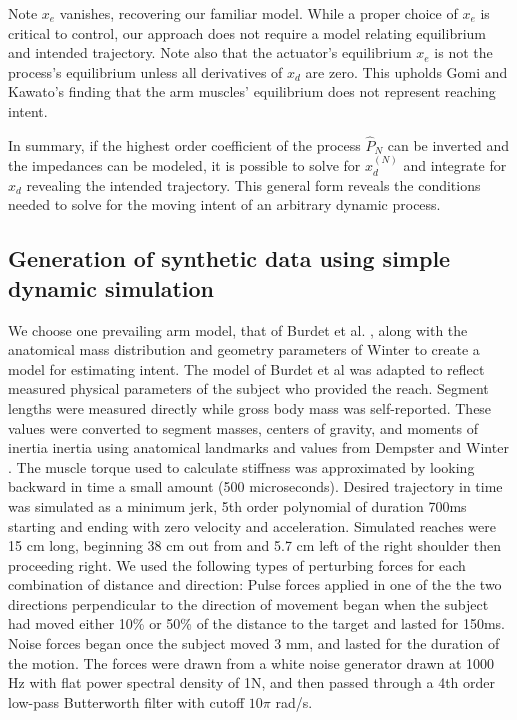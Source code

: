 \documentclass[10pt]{article}
\begin{document}
Note $x_e$ vanishes, recovering our familiar model. While a proper choice of $x_e$ is critical to control, our approach does not require a model relating equilibrium and intended trajectory. Note also that the actuator's equilibrium $x_e$ is not the process's equilibrium unless all derivatives of $x_d$ are zero. This upholds Gomi and Kawato's finding that the arm muscles' equilibrium does not represent reaching intent\cite{gomi1997human}.

In summary, if the highest order coefficient of the process $\hat{P}_N$ can be inverted and the impedances can be modeled, it is possible to solve for $x_d^{(N)}$ and integrate for $x_d$ revealing the intended trajectory. This general form reveals the conditions needed to solve for the moving intent of an arbitrary dynamic process. 

\subsection*{Generation of synthetic data using simple dynamic simulation}
We choose one prevailing arm model, that of Burdet et al. \cite{burdet2006stability}, along with the anatomical mass distribution and geometry parameters of Winter \cite{winter2009biomechanics} to create a model for estimating intent. The model of Burdet et al \cite{burdet2006stability} was adapted to reflect measured physical parameters of the subject who provided the reach. Segment lengths were measured directly while gross body mass was self-reported. These values were converted to segment masses, centers of gravity, and moments of inertia inertia using anatomical landmarks and values from Dempster \cite{dempster1955space} and Winter \cite{winter2009biomechanics}. The muscle torque used to calculate stiffness was approximated by looking backward in time a small amount (500 microseconds). Desired trajectory in time was simulated as a minimum jerk, 5th order polynomial of duration 700ms starting and ending with zero velocity and acceleration.
Simulated reaches were 15 cm long, beginning 38 cm out from and 5.7 cm left of the right shoulder then proceeding right.  We used the following types of perturbing forces for each combination of distance and direction: 
Pulse forces applied in one of the the two directions perpendicular to the direction of movement began when the subject had moved either 10\% or 50\% of the distance to the target and lasted for 150ms.
Noise forces began once the subject moved 3 mm, and lasted for the duration of the motion. The forces were drawn from a white noise generator drawn at 1000 Hz with flat power spectral density of 1N, and then passed through a 4th order low-pass Butterworth filter with cutoff $10\pi$ rad/s. 
\end{document}
